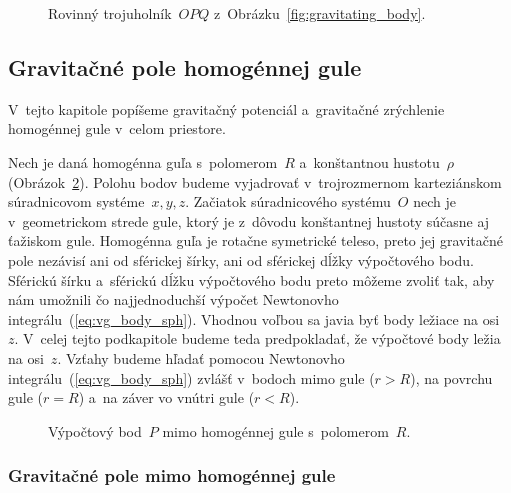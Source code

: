 \documentclass[a4paper, 12pt]{book}
\begin{document}
\begin{figure}
\centering

\caption{Rovinný trojuholník~$OPQ$ z~Obrázku~\ref{fig:gravitating_body}.}
\label{fig:distance_l}
\end{figure}

\subsection{Gravitačné pole homogénnej gule}
\label{sec:homogeneous_ball_gravitational_field}

V~tejto kapitole popíšeme gravitačný potenciál a~gravitačné zrýchlenie 
homogénnej gule v~celom priestore.

Nech je daná homogénna guľa s~polomerom~$R$ a~konštantnou hustotu~$\rho$ 
(Obrázok~\ref{fig:homogeneous_ball_out}).  Polohu bodov budeme vyjadrovať 
v~trojrozmernom karteziánskom súradnicovom systéme~$x, y, z$.  Začiatok 
súradnicového systému~$O$ nech je v~geometrickom strede gule, ktorý je z~dôvodu 
konštantnej hustoty súčasne aj ťažiskom gule.  Homogénna guľa je rotačne 
symetrické teleso, preto jej gravitačné pole nezávisí ani od sférickej šírky, 
ani od sférickej dĺžky výpočtového bodu.  Sférickú šírku a~sférickú dĺžku 
výpočtového bodu preto môžeme zvoliť tak, aby nám umožnili čo najjednoduchší 
výpočet Newtonovho integrálu~(\ref{eq:vg_body_sph}).  Vhodnou voľbou sa javia 
byť body ležiace na osi~$z$.  V~celej tejto podkapitole budeme teda 
predpokladať, že výpočtové body ležia na osi~$z$.  Vzťahy budeme hľadať pomocou 
Newtonovho integrálu~(\ref{eq:vg_body_sph}) zvlášť v~bodoch mimo gule ($r 
> R$), na povrchu gule ($r = R$) a~na záver vo vnútri gule ($r < R$).

\begin{figure}
\centering

\caption{Výpočtový bod~$P$ mimo homogénnej gule s~polomerom~$R$.}
\label{fig:homogeneous_ball_out}
\end{figure}

\subsubsection{Gravitačné pole mimo homogénnej gule}
\end{document}
